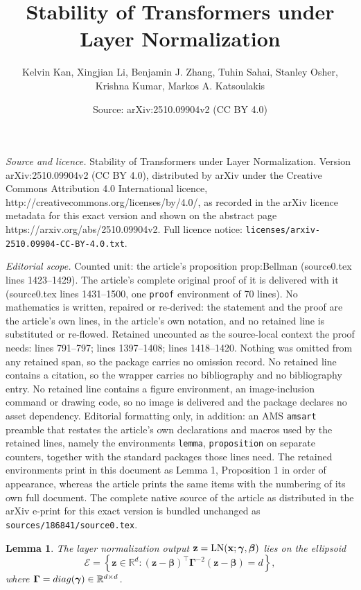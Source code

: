 \documentclass[10pt,a4paper]{amsart}
\title{Stability of Transformers under Layer Normalization}
\author{Kelvin Kan, Xingjian Li, Benjamin J. Zhang, Tuhin Sahai, Stanley Osher, Krishna Kumar, Markos A. Katsoulakis}
\date{Source: arXiv:2510.09904v2 (CC BY 4.0)}
\newtheorem{lemma}{Lemma}
\newcommand{\bfGamma}{{\boldsymbol \Gamma}}
\newcommand{\bfbeta}{{\boldsymbol \beta}}
\newcommand{\bfgamma}{{\boldsymbol \gamma}}
\newcommand{\bfx}{{\bf x}}
\newcommand{\bfz}{{\bf z}}
\begin{document}
\maketitle

\noindent\emph{Source and licence.} Stability of Transformers under Layer Normalization. Version arXiv:2510.09904v2 (CC BY 4.0), distributed by arXiv under the Creative Commons Attribution 4.0 International licence, http://creativecommons.org/licenses/by/4.0/, as recorded in the arXiv licence metadata for this exact version and shown on the abstract page https://arxiv.org/abs/2510.09904v2. Full licence notice: \texttt{licenses/arxiv-2510.09904-CC-BY-4.0.txt}.\par\smallskip

\noindent\textit{Editorial scope.} Counted unit: the article's proposition prop:Bellman (source0.tex lines 1423--1429). The article's complete original proof of it is delivered with it (source0.tex lines 1431--1500, one \texttt{proof} environment of 70 lines). No mathematics is written, repaired or re-derived: the statement and the proof are the article's own lines, in the article's own notation, and no retained line is substituted or re-flowed.  Retained uncounted as the source-local context the proof needs: lines 791--797; lines 1397--1408; lines 1418--1420.  Nothing was omitted from any retained span, so the package carries no omission record.  No retained line contains a citation, so the wrapper carries no bibliography and no bibliography entry.  No retained line contains a figure environment, an image-inclusion command or drawing code, so no image is delivered and the package declares no asset dependency.  Editorial formatting only, in addition: an AMS \texttt{amsart} preamble that restates the article's own declarations and macros used by the retained lines, namely the environments \texttt{lemma}, \texttt{proposition} on separate counters, together with the standard packages those lines need.  The retained environments print in this document as Lemma 1, Proposition 1 in order of appearance, whereas the article prints the same items with the numbering of its own full document.  The complete native source of the article as distributed in the arXiv e-print for this exact version is bundled unchanged as \texttt{sources/186841/source0.tex}.
\begin{lemma}\label{lemma:ellipsoid}
    The layer normalization output $\bfz=\text{LN}(\bfx; \bfgamma, \bfbeta)$ lies on the ellipsoid 
    $$
    \mathcal{E} = \left\{ \mathbf{z} \in \mathbb{R}^d : (\mathbf{z} - \bfbeta)^\top \bfGamma^{-2} (\mathbf{z} - \bfbeta) = d \right\}, 
    $$
    where $\bfGamma = {\rm diag}(\bfgamma)\in \mathbb{R}^{d\times d}$.
\end{lemma}
\end{document}
